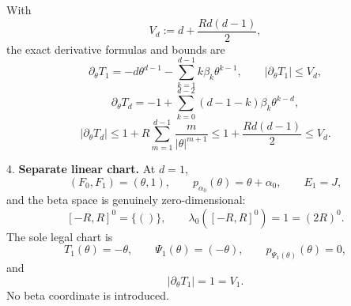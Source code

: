 \begin{proposition}
   With
\begin{equation}
\label{eq:appendix-indented-023}
   V_d:=d+\frac{Rd(d-1)}2,
\end{equation}
   the exact derivative formulas and bounds are
\begin{equation}
\label{eq:appendix-indented-024}
   \partial_\theta T_1
   =-d\theta^{d-1}-\sum_{k=1}^{d-1}k\beta_k\theta^{k-1},
   \qquad
   \lvert\partial_\theta T_1\rvert\leq V_d,
\end{equation}
\begin{equation}
\label{eq:appendix-indented-025}
   \partial_\theta T_d
   =-1+\sum_{k=0}^{d-2}(d-1-k)\beta_k\theta^{k-d},
\end{equation}
\begin{equation}
\label{eq:appendix-indented-026}
   \lvert\partial_\theta T_d\rvert
   \leq
   1+R\sum_{m=1}^{d-1}\frac{m}{\lvert\theta\rvert^{m+1}}
   \leq1+\frac{Rd(d-1)}2
   \leq V_d.
\end{equation}

4. \textbf{Separate linear chart.} At \(d=1\),
\begin{equation}
\label{eq:appendix-indented-027}
   (F_0,F_1)=(\theta,1),\qquad
   p_{\alpha_0}(\theta)=\theta+\alpha_0,
   \qquad
   E_1=J,
\end{equation}
   and the beta space is genuinely zero-dimensional:
\begin{equation}
\label{eq:appendix-indented-028}
   [-R,R]^0=\{()\},\qquad
   \lambda_0([-R,R]^0)=1=(2R)^0.
\end{equation}
   The sole legal chart is
\begin{equation}
\label{eq:appendix-indented-029}
   T_1(\theta)=-\theta,\qquad
   \Psi_1(\theta)=(-\theta),\qquad
   p_{\Psi_1(\theta)}(\theta)=0,
\end{equation}
   and
\begin{equation}
\label{eq:appendix-indented-030}
   \lvert\partial_\theta T_1\rvert=1=V_1.
\end{equation}
   No beta coordinate is introduced.


\end{proposition}
